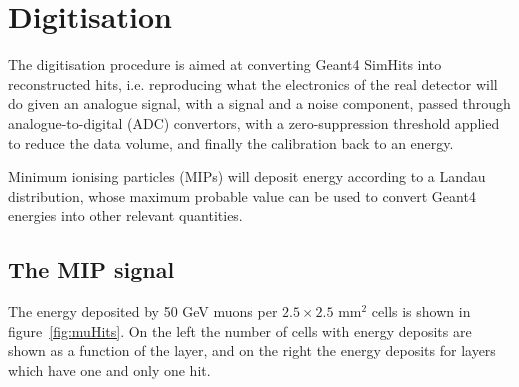 %
%
%
\clearpage
\section{Digitisation}
\label{sec:digi}

The digitisation procedure is aimed at converting Geant4 SimHits into
reconstructed hits, i.e. reproducing what the electronics of the real
detector will do given an analogue signal, with a signal and a noise
component, passed through analogue-to-digital (ADC) convertors, with a
zero-suppression threshold applied to reduce the data volume, and
finally the calibration back to an energy.

Minimum ionising particles (MIPs) will deposit energy according to a
Landau distribution, whose maximum probable value can be used to
convert Geant4 energies into other relevant quantities. 

\subsection{The MIP signal}

The energy deposited by 50 GeV muons per $2.5\times 2.5$ mm$^2$ cells
is shown in figure~\ref{fig:muHits}. On the left the number of cells
with energy deposits are shown as a function of the layer, and on the
right the energy deposits for layers which have one and only one hit.

